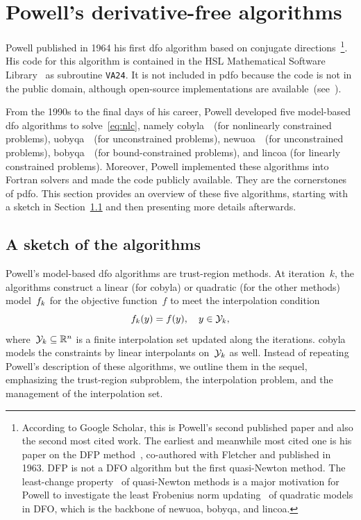 \documentclass[
    smallextended,  %
    final,        %
]{svjour3}
\newcommand{\R}{\mathbb{R}}
\newcommand{\objm}[1][k]{\obj\ifthenelse{\equal{#1}{}}{}{_{#1}}}
\newcommand{\obj}{f}
\newcommand{\xpt}[1][k]{\mathcal{Y}\ifthenelse{\equal{#1}{}}{}{_{#1}}}
\begin{document}
\section{Powell's derivative-free algorithms}
\label{sec:powell}

Powell published in 1964 his first \gls{dfo} algorithm based on conjugate directions~\cite{Powell_1964}\footnote{According to Google Scholar, this is Powell's second published paper and also the second most cited work.
The earliest and meanwhile most cited one is his paper on the DFP method~\cite{Fletcher_Powell_1963},
co-authored with Fletcher and published in 1963. DFP is not a DFO algorithm but the first
quasi-Newton method. The least-change property~\cite{Dennis_Schnabel_1979} of quasi-Newton methods
is a major motivation for Powell to investigate the least Frobenius norm updating~\cite{Powell_2004b}
of quadratic models in DFO, which is the backbone of \gls{newuoa}, \gls{bobyqa}, and \gls{lincoa}.}.
His code for this algorithm is contained in the HSL Mathematical Software Library~\cite{HSL} as subroutine \texttt{VA24}.
It is not included in \gls{pdfo} because the code is not in the public domain, although open-source implementations are available~(see~\cite[footnote~4]{Conn_Scheinberg_Toint_1997b}).

From the 1990s to the final days of his career, Powell developed five model-based \gls{dfo}
algorithms to solve~\eqref{eq:nlc}, namely \gls{cobyla}~\cite{Powell_1994}~(for nonlinearly
constrained problems), \gls{uobyqa}~\cite{Powell_2002}~(for unconstrained problems),
\gls{newuoa}~\cite{Powell_2006}~(for unconstrained problems), \gls{bobyqa}~\cite{Powell_2009}~(for
bound-constrained problems), and \gls{lincoa} (for linearly constrained problems).
Moreover, Powell implemented these algorithms into Fortran solvers and made the code publicly available.
They are the cornerstones of \gls{pdfo}.
This section provides an overview of these five algorithms, starting with a sketch in
Section~\ref{ssec:sketch} and then presenting more details afterwards.

\subsection{A sketch of the algorithms}
\label{ssec:sketch}

Powell's model-based \gls{dfo} algorithms are trust-region methods.
At iteration~$k$, the algorithms construct a linear (for \gls{cobyla}) or quadratic (for the other methods) model~$\objm$ for the objective function~$f$ to meet the interpolation condition
\begin{equation}
    \label{eq:itpls}
    \objm(y) = \obj(y), \quad y \in \xpt,
\end{equation}
where~$\xpt \subseteq \R^n$ is a finite interpolation set updated along the iterations.
\Gls{cobyla} models the constraints by linear interpolants on~$\xpt$ as well.
Instead of repeating Powell's description of these algorithms, we outline them in the sequel, emphasizing the trust-region subproblem, the interpolation problem, and the management of the interpolation set.
\end{document}
